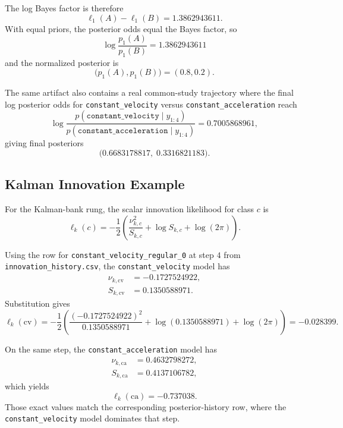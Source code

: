 \documentclass[11pt]{article}
\begin{document}
The log Bayes factor is therefore
\begin{equation}
\ell_1(A) - \ell_1(B) = 1.3862943611.
\end{equation}
With equal priors, the posterior odds equal the Bayes factor, so
\begin{equation}
\log \frac{p_1(A)}{p_1(B)} = 1.3862943611
\end{equation}
and the normalized posterior is
\begin{equation}
\bigl(p_1(A), p_1(B)\bigr) = (0.8, 0.2).
\end{equation}

The same artifact also contains a real common-study trajectory where the final log posterior odds for
\texttt{constant\_velocity} versus \texttt{constant\_acceleration} reach
\begin{equation}
\log \frac{p(\texttt{constant\_velocity} \mid y_{1:4})}
{p(\texttt{constant\_acceleration} \mid y_{1:4})}
= 0.7005868961,
\end{equation}
giving final posteriors
\begin{equation}
\bigl(0.6683178817,\; 0.3316821183\bigr).
\end{equation}

\subsection{Kalman Innovation Example}
For the Kalman-bank rung, the scalar innovation likelihood for class \(c\) is
\begin{equation}
\ell_k(c)
=
-\frac{1}{2}
\left(
\frac{\nu_{k,c}^2}{S_{k,c}}
+ \log S_{k,c}
+ \log(2\pi)
\right).
\end{equation}

Using the row for \texttt{constant\_velocity\_regular\_0} at step \(4\) from
\texttt{innovation\_history.csv}, the
\texttt{constant\_velocity} model has
\begin{align}
\nu_{k,\mathrm{cv}} &= -0.1727524922, \\
S_{k,\mathrm{cv}} &= 0.1350588971.
\end{align}
Substitution gives
\begin{equation}
\ell_k(\mathrm{cv})
=
-\frac{1}{2}
\left(
\frac{(-0.1727524922)^2}{0.1350588971}
+ \log(0.1350588971)
+ \log(2\pi)
\right)
= -0.028399.
\end{equation}

On the same step, the \texttt{constant\_acceleration} model has
\begin{align}
\nu_{k,\mathrm{ca}} &= 0.4632798272, \\
S_{k,\mathrm{ca}} &= 0.4137106782,
\end{align}
which yields
\begin{equation}
\ell_k(\mathrm{ca}) = -0.737038.
\end{equation}
Those exact values match the corresponding posterior-history row, where the
\texttt{constant\_velocity} model dominates that step.
\end{document}
